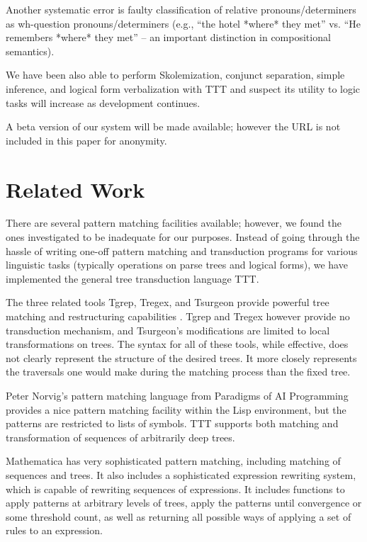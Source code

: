 \documentclass[11pt]{article}
\begin{document}
Another systematic error is faulty classification of relative pronouns/determiners as wh-question pronouns/determiners (e.g., ``the hotel *where* they met'' vs. ``He remembers *where* they met'' -- an important distinction in compositional semantics). 

We have been also able to perform Skolemization, conjunct separation, simple inference, and logical form verbalization with TTT and suspect its utility to logic tasks will increase as development continues.

A beta version of our system will be made available; however the URL is not included in this paper for anonymity. 


\section{Related Work}
There are several pattern matching facilities available; however, we found the ones investigated to be inadequate for our purposes.  Instead of going through the hassle of writing one-off pattern matching and transduction programs for various linguistic tasks (typically operations on parse trees and logical forms), we have implemented the general tree transduction language TTT. 

The three related tools Tgrep, Tregex, and Tsurgeon provide powerful tree matching and restructuring capabilities \cite{Levy06}. Tgrep and Tregex however provide no transduction mechanism, and Tsurgeon's modifications are limited to local transformations on trees.  The syntax for all of these tools, while effective, does not clearly represent the structure of the desired trees. It more closely represents the traversals one would make during the matching process than the fixed tree.

Peter Norvig's pattern matching language from Paradigms of AI Programming provides a nice pattern matching facility within the Lisp environment, but the patterns are restricted to lists of symbols.  TTT supports both matching and transformation of sequences of arbitrarily deep trees. \cite{paip}

Mathematica has very sophisticated pattern matching, including matching of sequences and trees.  It also includes a sophisticated expression rewriting system, which is capable of rewriting sequences of expressions.  It includes functions to apply patterns at arbitrary levels of trees, apply the patterns until convergence or some threshold count, as well as returning all possible ways of applying a set of rules to an expression.  \cite{Mathematicareference}
\end{document}
